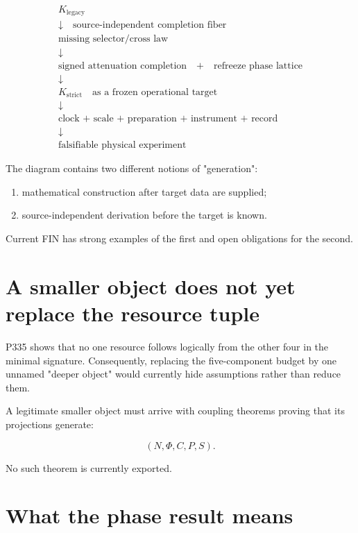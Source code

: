 \documentclass[11pt,a4paper,openany]{report}
\begin{document}
\[
\begin{array}{c}
K_{\mathrm{legacy}}
\\[1mm]
\downarrow\quad
\text{source-independent completion fiber}
\\[1mm]
\boxed{\text{missing selector/cross law}}
\\[1mm]
\downarrow
\\[1mm]
\text{signed attenuation completion}
\quad+\quad
\text{refreeze phase lattice}
\\[1mm]
\downarrow
\\[1mm]
K_{\mathrm{strict}}
\quad\text{as a frozen operational target}
\\[1mm]
\downarrow
\\[1mm]
\text{clock + scale + preparation + instrument + record}
\\[1mm]
\downarrow
\\[1mm]
\text{falsifiable physical experiment}
\end{array}
\]

The diagram contains two different notions of "generation":

\begin{enumerate}
\item 
mathematical construction after target data are supplied;

\item 
source-independent derivation before the target is known.

\end{enumerate}

Current FIN has strong examples of the first and open obligations for the second.

\section{A smaller object does not yet replace the resource tuple}

P335 shows that no one resource follows logically from the other four in the minimal signature.  Consequently, replacing the five-component budget by one unnamed "deeper object" would currently hide assumptions rather than reduce them.

A legitimate smaller object must arrive with coupling theorems proving that its projections generate:

\[
(N,\Phi,C,P,S).
\]

No such theorem is currently exported.

\section{What the phase result means}
\end{document}
